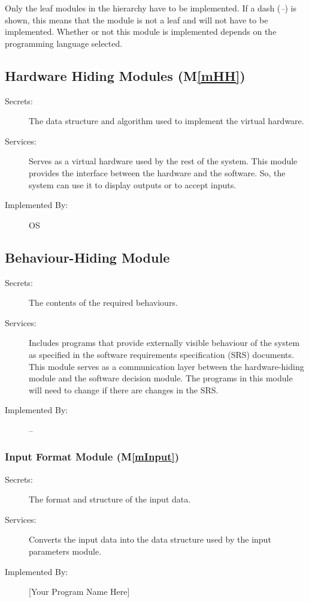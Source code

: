 \documentclass[12pt, titlepage]{article}
\newcommand{\mref}[1]{M\ref{#1}}
\begin{document}
Only the leaf modules in the
hierarchy have to be implemented. If a dash (\emph{--}) is shown, this means
that the module is not a leaf and will not have to be implemented. Whether or
not this module is implemented depends on the programming language
selected.

\subsection{Hardware Hiding Modules (\mref{mHH})}

\begin{description}
\item[Secrets:]The data structure and algorithm used to implement the virtual
  hardware.
\item[Services:]Serves as a virtual hardware used by the rest of the
  system. This module provides the interface between the hardware and the
  software. So, the system can use it to display outputs or to accept inputs.
\item[Implemented By:] OS
\end{description}

\subsection{Behaviour-Hiding Module}

\begin{description}
\item[Secrets:]The contents of the required behaviours.
\item[Services:]Includes programs that provide externally visible behaviour of
  the system as specified in the software requirements specification (SRS)
  documents. This module serves as a communication layer between the
  hardware-hiding module and the software decision module. The programs in this
  module will need to change if there are changes in the SRS.
\item[Implemented By:] --
\end{description}

\subsubsection{Input Format Module (\mref{mInput})}

\begin{description}
\item[Secrets:]The format and structure of the input data.
\item[Services:]Converts the input data into the data structure used by the
  input parameters module.
\item[Implemented By:] [Your Program Name Here]
\end{description}
\end{document}
